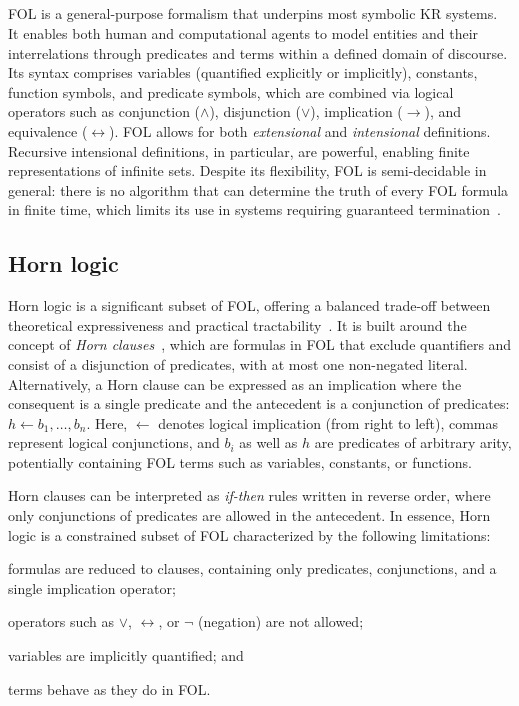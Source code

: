 \subsection[First-order logic]{}\label{subsec:first-order-logic}
%
\Gls{FOL} is a general-purpose formalism that underpins most symbolic \gls{KR} systems.
%
It enables both human and computational agents to model entities and their interrelations through predicates and terms within a defined domain of discourse.
%
Its syntax comprises variables (quantified explicitly or implicitly), constants, function symbols, and predicate symbols, which are combined via logical operators such as conjunction (\(\wedge\)), disjunction (\(\vee\)), implication (\(\rightarrow\)), and equivalence (\(\leftrightarrow\)).
%
\Gls{FOL} allows for both \emph{extensional} and \emph{intensional} definitions.
%
Recursive intensional definitions, in particular, are powerful, enabling finite representations of infinite sets.
%
Despite its flexibility, \gls{FOL} is semi-decidable in general: there is no algorithm that can determine the truth of every \gls{FOL} formula in finite time, which limits its use in systems requiring guaranteed termination~\cite{DBLP:conf/dlog/2003handbook}.


\subsection{Horn logic}\label{subsec:horn-logic}
%
Horn logic is a significant subset of \gls{FOL}, offering a balanced trade-off between theoretical expressiveness and practical tractability~\cite{DBLP:journals/jcss/Makowsky87}.
%
It is built around the concept of \emph{Horn clauses}~\cite{DBLP:journals/jsyml/Horn51}, which are formulas in \gls{FOL} that exclude quantifiers and consist of a disjunction of predicates, with at most one non-negated literal.
%
Alternatively, a Horn clause can be expressed as an implication where the consequent is a single predicate and the antecedent is a conjunction of predicates: \(h \gets b_1, \dots, b_n\).
%
Here, \(\gets\) denotes logical implication (from right to left), commas represent logical conjunctions, and \(b_i\) as well as \(h\) are predicates of arbitrary arity, potentially containing \gls{FOL} terms such as variables, constants, or functions.

Horn clauses can be interpreted as \emph{if-then} rules written in reverse order, where only conjunctions of predicates are allowed in the antecedent.
%
In essence, Horn logic is a constrained subset of \gls{FOL} characterized by the following limitations:
%
\begin{inlinelist}
%
    \item formulas are reduced to clauses, containing only predicates, conjunctions, and a single implication operator;
    \item operators such as \(\lor\), \(\leftrightarrow\), or \(\neg\) (negation) are not allowed;
    \item variables are implicitly quantified; and
    \item terms behave as they do in \gls{FOL}.
\end{inlinelist}


